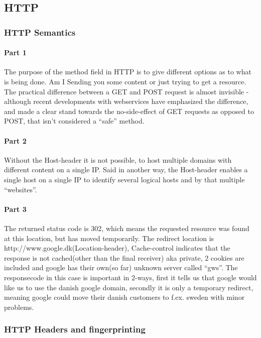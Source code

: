 \subsection{HTTP}

\subsubsection{HTTP Semantics}
\paragraph{Part 1} The purpose of the method field in HTTP is to give different
options as to what is being done. Am I Sending you some content or just trying
to get a resource. The practical difference between a GET and POST request is
almost invisible - although recent developments with webservices have
emphasized the difference, and made a clear stand towards the no-side-effect of
GET requests as opposed to POST, that isn't considered a ``safe'' method.

\paragraph{Part 2} Without the Host-header it is not possible, to host multiple
domains with different content on a single IP. Said in another way, the
Host-header enables a single host on a single IP to identify several logical
hosts and by that multiple ``websites''.

\paragraph{Part 3} The returned status code is 302, which means the requested
resource was found at this location, but has moved temporarily. The redirect
location is http://www.google.dk(Location-header), Cache-control indicates that
the response is not cached(other than the final receiver) aka private, 2 
cookies are included and google has their own(so far) unknown server called 
``gws''. The responsecode in this case is important in 2-ways, first it tells
us that google would like us to use the danish google domain, secondly it is
only a temporary redirect, meaning google could move their danish customers to
f.ex. sweden with minor problems.

\subsubsection{HTTP Headers and fingerprinting}

